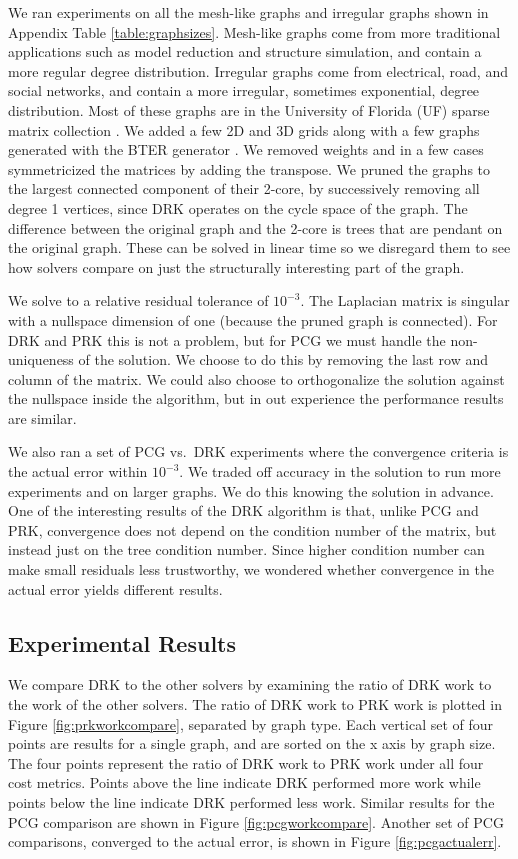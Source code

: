 \documentclass{sig-alternate}
\begin{document}
We ran experiments on all the mesh-like graphs
and irregular graphs shown in Appendix Table \ref{table:graphsizes}.
Mesh-like graphs come from more traditional applications
such as model reduction and
structure simulation, and contain a more regular degree distribution.
Irregular graphs come from electrical, road, and social networks, and
contain a more irregular, sometimes exponential, degree distribution.
Most of these graphs are in the University of Florida (UF)
sparse matrix collection \cite{DavisHu2011}.
We added a few 2D and 3D grids along with a few graphs generated with
the BTER generator \cite{KPPS2014}.
We removed weights and in a few cases symmetricized the matrices by
adding the transpose.
We pruned the graphs to the largest connected component of
their 2-core, by successively removing
all degree 1 vertices, since DRK operates
on the cycle space of the graph.
The difference between the original graph and the 2-core
is trees that are pendant on the original graph. These can be solved in linear
time so we disregard them to see how solvers compare on just
the structurally interesting
part of the graph.



We solve to a relative residual tolerance of $10^{-3}$.
The Laplacian matrix is singular with a nullspace dimension of one
(because the pruned graph is connected).
For DRK and PRK this is not a problem, but for PCG we must handle
the non-uniqueness of the solution.
We choose to do this
by removing the last row and column of the matrix.
We could also choose to orthogonalize the solution against
the nullspace inside the algorithm, but
in out experience the performance results are similar.


We also
ran a set of PCG vs.\ DRK experiments where the convergence criteria
is the actual error within $10^{-3}$.
We traded off accuracy in the solution to run more
experiments and on larger graphs.
We do this knowing the solution in advance.
One of the interesting results
of the DRK algorithm is that, unlike PCG and PRK,
convergence does not depend on the condition
number of the matrix, but instead just on the tree condition number.
Since higher condition number can make small residuals
less trustworthy, we wondered whether convergence in
the actual error yields different results.

\subsection{Experimental Results} 
We compare DRK to the other solvers by examining the ratio
of DRK work to the work of the other solvers.
The ratio of DRK work to PRK
work is plotted in Figure \ref{fig:prkworkcompare},
separated by graph type.
Each vertical set of four points are results for
a single graph, and are sorted on the x axis by graph size.
The four points represent the ratio
of DRK work to PRK work under all four cost metrics.
Points above the line indicate DRK performed more work while
points below the line indicate DRK performed less work.
Similar results for the PCG comparison are shown
in Figure \ref{fig:pcgworkcompare}.
Another set of PCG comparisons, converged to the actual
error, is shown in Figure \ref{fig:pcgactualerr}.
\end{document}
